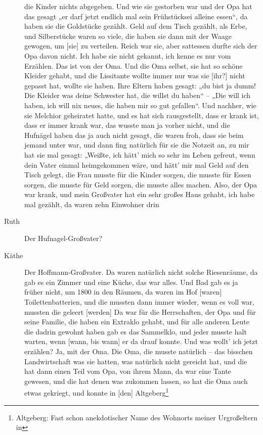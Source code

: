 \documentclass[ngerman,]{article}
\begin{document}
\begin{multicols}{3}
\begin{description}
die Kinder nichts abgegeben. Und wie sie gestorben war und der Opa hat
das gesagt „er darf jetzt endlich mal sein Frühstücksei alleine essen“,
da haben sie die Goldstücke gezählt. Geld auf dem Tisch gezählt, als
Erbe, und Silberstücke waren so viele, die haben sie dann mit der Waage
gewogen, um {[}sie{]} zu verteilen. Reich war sie, aber sattessen durfte
sich der Opa davon nicht. Ich habe sie nicht gekannt, ich kenne es nur
vom Erzählen. Das ist von der Oma. Und die Oma selbst, sie hat so schöne
Kleider gehabt, und die Lissitante wollte immer nur was sie {[}ihr?{]}
nicht gepasst hat, wollte sie haben. Ihre Eltern haben gesagt: „du bist
ja dumm! Die Kleider was deine Schwester hat, die willst du haben“ –
„Die will ich haben, ich will nix neues, die haben mir so gut gefallen“.
Und nachher, wie sie Melchior geheiratet hatte, und es hat sich
rausgestellt, dass er krank ist, dass er immer krank war, das wusste man
ja vorher nicht, und die Hufnägel haben das ja auch nicht gesagt, die
waren froh, dass sie beim jemand unter war, und dann fing natürlich für
sie die Notzeit an, zu mir hat sie mal gesagt: „Weißte, ich hätt' mich
so sehr im Leben gefreut, wenn dein Vater einmal heimgekommen wäre, und
hätt' mir mal Geld auf den Tisch gelegt, die Frau musste für die Kinder
sorgen, die musste für Essen sorgen, die musste für Geld sorgen, die
musste alles machen. Also, der Opa war krank, und mein Großvater hat ein
sehr großes Haus gehabt, ich habe mal gezählt, da waren zehn Einwohner
drin
\item[Ruth]
Der Hufnagel-Großvater?
\item[Käthe]
Der Hoffmann-Großvater. Da waren natürlich nicht solche Riesenräume, da
gab es ein Zimmer und eine Küche, das war alles. Und Bad gab es ja
früher nicht, um 1800 in den Räumen, da waren im Hof {[}waren{]}
Toilettenbatterien, und die mussten dann immer wieder, wenn es voll war,
mussten die geleert {[}werden{]} Da war für die Herrschaften, der Opa
und für seine Familie, die haben ein Extraklo gehabt, und für alle
anderen Leute die dadrin gewohnt haben gab es das Sammelklo, und jeder
musste halt warten, wenn {[}wann, bis wann{]} er da drauf konnte. Und
was wollt' ich jetzt erzählen? Ja, mit der Oma. Die Oma, die musste
natürlich – das bisschen Landwirtschaft was sie hatten, was natürlich
nicht gereicht hat, und die hat dann einen Teil vom Opa, von ihrem Mann,
da war eine Tante gewesen, und die hat denen was zukommen lassen, so hat
die Oma auch etwas gekriegt, und konnte in {[}den{]} Altgeberg\footnote{Altgeberg:
  Fast schon anekdotischer Name des Wohnorts meiner Urgroßeltern in
}
\end{description}
\end{multicols}
\end{document}

